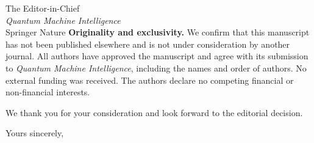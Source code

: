 \documentclass[11pt]{letter}
\begin{document}
\begin{letter}{The Editor-in-Chief\\
\emph{Quantum Machine Intelligence}\\
Springer Nature}
\medskip
\textbf{Originality and exclusivity.}
We confirm that this manuscript has not been published elsewhere and is not under consideration by another journal.  All authors have approved the manuscript and agree with its submission to \emph{Quantum Machine Intelligence}, including the names and order of authors.  No external funding was received.  The authors declare no competing financial or non-financial interests.

\medskip
We thank you for your consideration and look forward to the editorial decision.

\closing{Yours sincerely,}

\end{letter}
\end{document}
